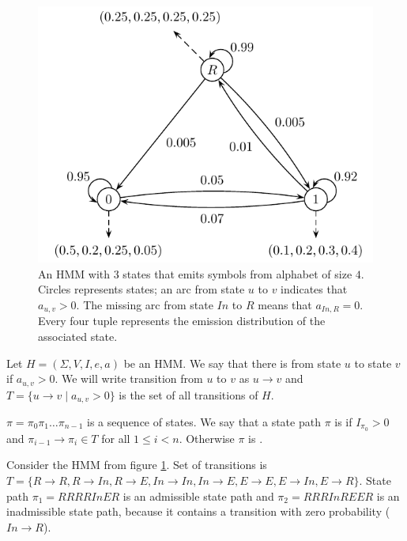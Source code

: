 \begin{figure}
\begin{center}
\includegraphics{../figures/exampleHMM.pdf}
\end{center}
\caption[Example of simple Hidden Markov Model]{
An HMM with $3$ states
that emits symbols from alphabet of size $4$.  Circles represents states; an arc
from state $u$ to $v$ indicates that $a_{u,v}>0$. The missing arc from state
$In$ to $R$ means that $a_{In,R}=0$. Every four tuple represents the emission distribution of the associated state.
}\label{FIGURE:EXAMPLEHMM} 
\end{figure}


\begin{definition}\label{DEF:STATEPATH}
Let $H=(\Sigma,V,I,e,a)$ be an HMM. We say that there is 
from state $u$ to state $v$ if $a_{u,v}>0$. We will write transition from $u$ to
$v$ as $u\to v$ and $T=\{u\to v\mid a_{u,v}>0\}$ is the set of all transitions of
$H$.

 $\pi=\pi_0\pi_1\dots\pi_{n-1}$ is a sequence of
states. We say that a state path $\pi$ is  if $I_{\pi_0}>0$
and  $\pi_{i-1}\to\pi_i\in T$ for all $1\leq i < n$. Otherwise $\pi$ is
.
\end{definition}

\begin{example}
Consider the HMM from figure \ref{FIGURE:EXAMPLEHMM}. Set of transitions is
$T=\{R\to R,R\to In, R\to E,In\to In, In\to E, E\to E, E\to In, E\to R\}$.
State path $\pi_1=RRRRInER$ is an admissible state path and $\pi_2=RRRInREER$
is an inadmissible state path, because it contains a transition with zero
probability ($In\to R$).
\end{example}



